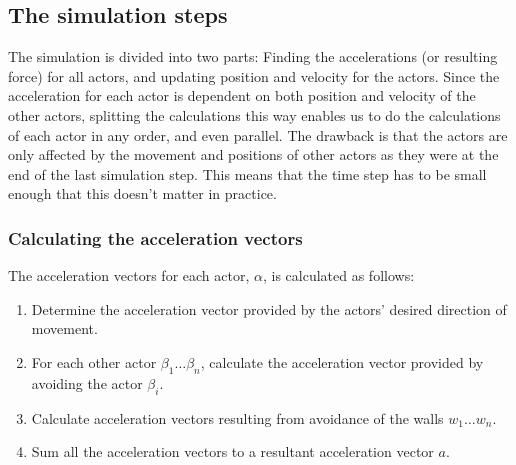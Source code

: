 


\subsection{The simulation steps}
The simulation is divided into two parts: Finding the accelerations (or 
resulting force) for all actors, and updating position and velocity for the 
actors.  Since the acceleration for each actor is dependent on both position 
and velocity of the other actors, splitting the calculations this way enables 
us to do the calculations of each actor in any order, and even parallel. The 
drawback is that the actors are only affected by the movement and positions of 
other actors as they were at the end of the last simulation step. This means 
that the time step has to be small enough that this doesn't matter in 
practice.

\subsubsection{Calculating the acceleration vectors}
The acceleration vectors for each actor, $\alpha$, is calculated as follows:

\begin{enumerate}
    \item Determine the acceleration vector provided by the actors' desired 
        direction of movement.
    \item For each other actor $\beta_1\dots\beta_n$, calculate the 
        acceleration vector provided by avoiding the actor $\beta_i$.
    \item Calculate acceleration vectors resulting from avoidance of the walls 
        $w_1\dots w_n$.
    \item Sum all the acceleration vectors to a resultant acceleration vector 
        $a$.
\end{enumerate}

